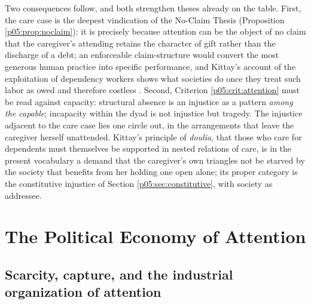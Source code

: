 \documentclass[11pt,a4paper]{article}
\theoremstyle{seriesthm}
\begin{document}
Two consequences follow, and both strengthen theses already on the table. First, the care case is the deepest vindication of the No-Claim Thesis (Proposition \ref{p05:prop:noclaim}): it is precisely because attention can be the object of no claim that the caregiver's attending retains the character of gift rather than the discharge of a debt; an enforceable claim-structure would convert the most generous human practice into specific performance, and Kittay's account of the exploitation of dependency workers shows what societies do once they treat such labor as owed and therefore costless \parencite{kittay1999}. Second, Criterion \ref{p05:crit:attention} must be read against capacity: structural absence is an injustice as a pattern \emph{among the capable}; incapacity within the dyad is not injustice but tragedy. The injustice adjacent to the care case lies one circle out, in the arrangements that leave the caregiver herself unattended. Kittay's principle of \emph{doulia}, that those who care for dependents must themselves be supported in nested relations of care, is in the present vocabulary a demand that the caregiver's own triangles not be starved by the society that benefits from her holding one open alone; its proper category is the constitutive injustice of Section \ref{p05:sec:constitutive}, with society as addressee.

\section{The Political Economy of Attention}
\label{p05:sec:economy}

\subsection{Scarcity, capture, and the industrial organization of attention}
\end{document}
